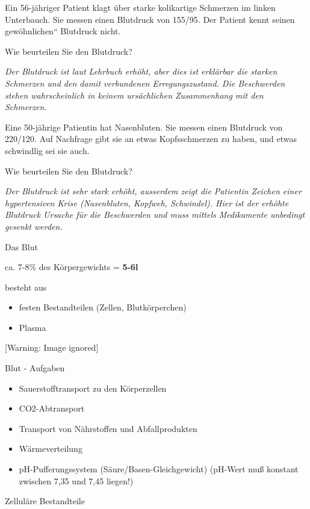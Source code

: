 \documentclass{article}
\newcommand\gEs[1]{\textbf{\textcolor[rgb]{0.0,0.0,0.5019608}{#1}}}
\newcommand\gEs[1]{\textbf{\textcolor[rgb]{0.0,0.0,0.5019608}{#1}}}
\newcommand\gZ[1]{\textcolor[rgb]{0.5019608,0.5019608,0.5019608}{#1}}
\begin{document}
Ein 56-j\"ahriger Patient klagt \"uber starke kolikartige Schmerzen im
linken Unterbauch. Sie messen einen Blutdruck von 155/95. Der Patient
kennt seinen {\quotedblbase}gew\"ohnlichen{\textquotedblleft} Blutdruck
nicht.  

Wie beurteilen Sie den Blutdruck? 

{\itshape
Der Blutdruck ist laut Lehrbuch erh\"oht, aber dies ist erkl\"arbar die
starken Schmerzen und den damit verbundenen Erregungszustand. Die
Beschwerden stehen wahrscheinlich in keinem urs\"achlichen Zusammenhang
mit den Schmerzen. }

Eine 50-j\"ahrige Patientin hat Nasenbluten. Sie messen einen Blutdruck
von 220/120. Auf Nachfrage gibt sie an etwas Kopfsschmerzen zu haben,
und etwas schwindlig sei sie auch. 

Wie beurteilen Sie den Blutdruck? 

{\itshape
Der Blutdruck ist sehr stark erh\"oht, ausserdem zeigt die Patientin
Zeichen einer hypertensiven Krise (Nasenbluten, Kopfweh, Schwindel).
Hier ist der erh\"ohte Blutdruck Ursache f\"ur die Beschwerden und muss
mittels Medikamente unbedingt gesenkt werden. }

{\mdseries\color[rgb]{0.0,0.0,0.5019608}
Das Blut}

{\mdseries
ca. 7-8\% des K\"orpergewichts = \gEs{5-6l}}

{\mdseries
besteht aus}

\begin{itemize}
\item {\mdseries
festen Bestandteilen (Zellen, Blutk\"orperchen)}

\item {\mdseries
{}Plasma}

\end{itemize}
  [Warning: Image ignored] %
 

{\mdseries\color{black}
Blut - Aufgaben}

\begin{itemize}
\item {\mdseries
Sauerstofftransport zu den K\"orperzellen}

\item {\mdseries
CO2-Abtransport}

\item {\mdseries
Transport von N\"ahrstoffen und Abfallprodukten}

\item {\mdseries
W\"armeverteilung}

\item {\mdseries
\gZ{pH-Pufferungssystem (S\"aure/Basen-Gleichgewicht)
(pH-Wert mu{\ss} konstant zwischen 7,35 und 7,45 liegen!)}}

\end{itemize}
{\mdseries\color{black}
Zellul\"are Bestandteile}
\end{document}

